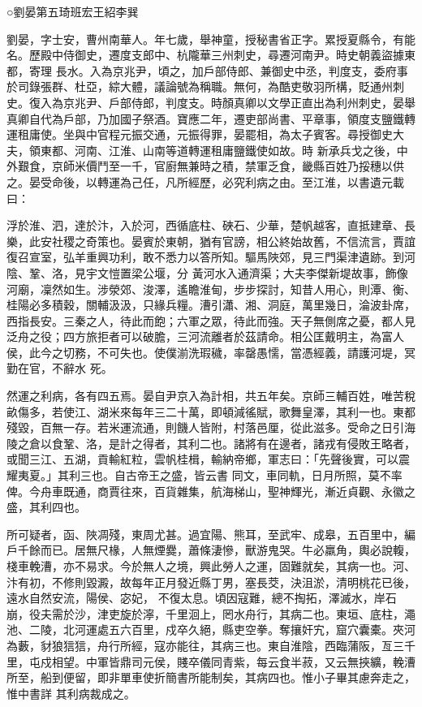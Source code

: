 
\begin{pinyinscope}

 ○劉晏第五琦班宏王紹李巽



 劉晏，字士安，曹州南華人。年七歲，舉神童，授秘書省正字。累授夏縣令，有能名。歷殿中侍御史，遷度支郎中、杭隴華三州刺史，尋遷河南尹。時史朝義盜據東都，寄理
 長水。入為京兆尹，頃之，加戶部侍郎、兼御史中丞，判度支，委府事於司錄張群、杜亞，綜大體，議論號為稱職。無何，為酷吏敬羽所構，貶通州刺史。復入為京兆尹、戶部侍郎，判度支。時顏真卿以文學正直出為利州刺史，晏舉真卿自代為戶部，乃加國子祭酒。寶應二年，遷吏部尚書、平章事，領度支鹽鐵轉運租庸使。坐與中官程元振交通，元振得罪，晏罷相，為太子賓客。尋授御史大夫，領東都、河南、江淮、山南等道轉運租庸鹽鐵使如故。時
 新承兵戈之後，中外艱食，京師米價鬥至一千，官廚無兼時之積，禁軍乏食，畿縣百姓乃挼穗以供之。晏受命後，以轉運為己任，凡所經歷，必究利病之由。至江淮，以書遺元載曰：



 浮於淮、泗，達於汴，入於河，西循底柱、硤石、少華，楚帆越客，直抵建章、長樂，此安社稷之奇策也。晏賓於東朝，猶有官謗，相公終始故舊，不信流言，賈誼復召宣室，弘羊重興功利，敢不悉力以答所知。驅馬陜郊，見三門渠津遺跡。到河陰、鞏、洛，見宇文愷置梁公堰，分
 黃河水入通濟渠；大夫李傑新堤故事，飾像河廟，凜然如生。涉滎郊、浚澤，遙瞻淮甸，步步探討，知昔人用心，則潭、衡、桂陽必多積穀，關輔汲汲，只緣兵糧。漕引瀟、湘、洞庭，萬里幾日，淪波卦席，西指長安。三秦之人，待此而飽；六軍之眾，待此而強。天子無側席之憂，都人見泛舟之役；四方旅拒者可以破膽，三河流離者於茲請命。相公匡戴明主，為富人侯，此今之切務，不可失也。使僕湔洗瑕穢，率罄愚懦，當憑經義，請護河堤，冥勤在官，不辭水
 死。



 然運之利病，各有四五焉。晏自尹京入為計相，共五年矣。京師三輔百姓，唯苦稅畝傷多，若使江、湖米來每年三二十萬，即頓減徭賦，歌舞皇澤，其利一也。東都殘毀，百無一存。若米運流通，則饑人皆附，村落邑厘，從此滋多。受命之日引海陵之倉以食鞏、洛，是計之得者，其利二也。諸將有在邊者，諸戎有侵敗王略者，或聞三江、五湖，貢輸紅粒，雲帆桂楫，輸納帝鄉，軍志曰：「先聲後實，可以震耀夷夏。」其利三也。自古帝王之盛，皆云書
 同文，車同軌，日月所照，莫不率俾。今舟車既通，商賈往來，百貨雜集，航海梯山，聖神輝光，漸近貞觀、永徽之盛，其利四也。



 所可疑者，函、陜凋殘，東周尤甚。過宜陽、熊耳，至武牢、成皋，五百里中，編戶千餘而已。居無尺椽，人無煙爨，蕭條淒慘，獸游鬼哭。牛必羸角，輿必說輹，棧車輓漕，亦不易求。今於無人之境，興此勞人之運，固難就矣，其病一也。河、汴有初，不修則毀澱，故每年正月發近縣丁男，塞長茭，決沮淤，清明桃花已後，遠水自然安流，陽侯、宓妃，
 不復太息。頃因寇難，總不掏拓，澤滅水，岸石崩，役夫需於沙，津吏旋於濘，千里洄上，罔水舟行，其病二也。東垣、底柱，澠池、二陵，北河運處五六百里，戍卒久絕，縣吏空拳。奪攘奸宄，窟穴囊橐。夾河為藪，豺狼狺狺，舟行所經，寇亦能往，其病三也。東自淮陰，西臨蒲阪，亙三千里，屯戍相望。中軍皆鼎司元侯，賤卒儀同青紫，每云食半菽，又云無挾纊，輓漕所至，船到便留，即非單車使折簡書所能制矣，其病四也。惟小子畢其慮奔走之，惟中書詳
 其利病裁成之。




\end{pinyinscope}
